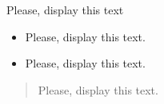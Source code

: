 \documentclass{sample}
\begin{document}
\medskip
\hspace*{6pt} Please, display this text
\medskip
\begin{itemize}
    \item[] Please, display this text.
\end{itemize}
\begin{itemize}
    \item Please, display this text.
\end{itemize}
\begin{quote}
    Please, display this text.
\end{quote}
\end{document}
